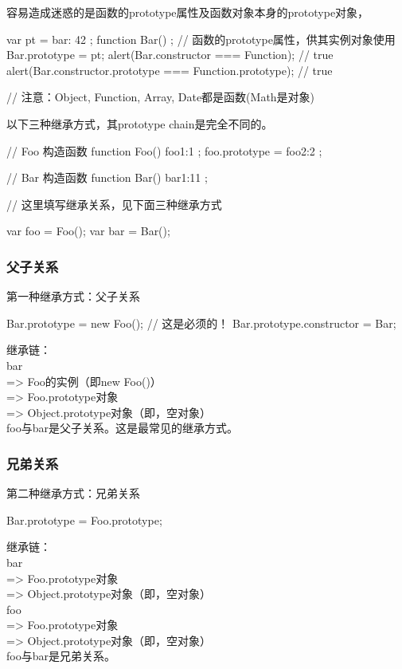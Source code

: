 容易造成迷惑的是函数的prototype属性及函数对象本身的prototype对象，

\begin{javascriptcode}
var pt = {
    bar: 42
};
function Bar() {};
// 函数的prototype属性，供其实例对象使用
Bar.prototype = pt;
alert(Bar.constructor === Function); // true
alert(Bar.constructor.prototype === Function.prototype); // true

// 注意：Object, Function, Array, Date都是函数(Math是对象)
\end{javascriptcode}

以下三种继承方式，其prototype chain是完全不同的。

\begin{javascriptcode}
  // Foo 构造函数
  function Foo() { foo1:1 };
  foo.prototype = { foo2:2 };

  // Bar 构造函数
  function Bar() { bar1:11 };

  // 这里填写继承关系，见下面三种继承方式

  var foo = Foo();
  var bar = Bar();
\end{javascriptcode}

\subsubsection[父子关系]{父子关系}
第一种继承方式：父子关系

\begin{javascriptcode}
  Bar.prototype = new Foo();
  // 这是必须的！
  Bar.prototype.constructor = Bar;
\end{javascriptcode}

继承链：\\
bar\\
=> Foo的实例（即new Foo()）\\
=> Foo.prototype对象\\
=> Object.prototype对象（即{}，空对象）\\
foo与bar是父子关系。这是最常见的继承方式。

\subsubsection[兄弟关系]{兄弟关系}
第二种继承方式：兄弟关系

\begin{javascriptcode}
  Bar.prototype = Foo.prototype;
\end{javascriptcode}

继承链：\\
bar\\
=> Foo.prototype对象\\
=> Object.prototype对象（即{}，空对象）\\
foo\\
=> Foo.prototype对象\\
=> Object.prototype对象（即{}，空对象）\\
foo与bar是兄弟关系。

